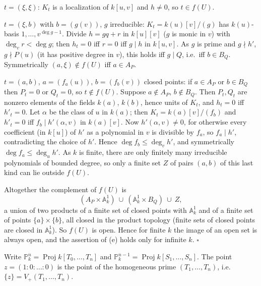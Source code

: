 \documentclass[11pt]{article}
\begin{document}
$t=(\xi,\xi)$: $K_t$ is a localization of $k[u,v]$ and $h\ne0$, so $t\in f(U)$.

$t=(\xi,b)$ with $b=(g(v))$, $g$ irreducible: $K_t=k(u)[v]/(g)$ has $k(u)$-basis $1,\dots,v^{\deg g-1}$. Divide $h=gq+r$ in $k[u][v]$ ($g$ is monic in $v$) with $\deg_vr<\deg g$; then $h_t=0$ iff $r=0$ iff $g\mid h$ in $k[u,v]$. As $g$ is prime and $g\nmid h'$, $g\nmid P(u)$ (it has positive degree in $v$), this holds iff $g\mid Q$, i.e.\ iff $b\in B_Q$. Symmetrically $(a,\xi)\notin f(U)$ iff $a\in A_P$.

$t=(a,b)$, $a=(f_a(u))$, $b=(f_b(v))$ closed points: if $a\in A_P$ or $b\in B_Q$ then $P_t=0$ or $Q_t=0$, so $t\notin f(U)$. Suppose $a\notin A_P$, $b\notin B_Q$. Then $P_t,Q_t$ are nonzero elements of the fields $k(a)$, $k(b)$, hence units of $K_t$, and $h_t=0$ iff $h'_t=0$. Let $\alpha$ be the class of $u$ in $k(a)$; then $K_t=k(a)[v]/(f_b)$ and $h'_t=0$ iff $f_b\mid h'(\alpha,v)$ in $k(a)[v]$. Now $h'(\alpha,v)\neq0$, for otherwise every coefficient (in $k[u]$) of $h'$ as a polynomial in $v$ is divisible by $f_a$, so $f_a\mid h'$, contradicting the choice of $h'$. Hence $\deg f_b\le\deg_vh'$, and symmetrically $\deg f_a\le\deg_uh'$. As $k$ is finite, there are only finitely many irreducible polynomials of bounded degree, so only a finite set $Z$ of pairs $(a,b)$ of this last kind can lie outside $f(U)$.

Altogether the complement of $f(U)$ is
\[ (A_P\times\mathbb A^1_k)\ \cup\ (\mathbb A^1_k\times B_Q)\ \cup\ Z, \]
a union of two products of a finite set of closed points with $\mathbb A^1_k$ and of a finite set of points $\{a\}\times\{b\}$, all closed in the product topology (finite sets of closed points are closed in $\mathbb A^1_k$). So $f(U)$ is open. Hence for finite $k$ the image of an open set is always open, and the assertion of (e) holds only for infinite $k$. \hfill$\square$

\pf
Write $\mathbb P^n_k=\operatorname{Proj}k[T_0,\dots,T_n]$ and $\mathbb P^{n-1}_k=\operatorname{Proj}k[S_1,\dots,S_n]$. The point $z=(1:0:\dots:0)$ is the point of the homogeneous prime $(T_1,\dots,T_n)$, i.e. $\{z\}=V_+(T_1,\dots,T_n)$.
\end{document}
